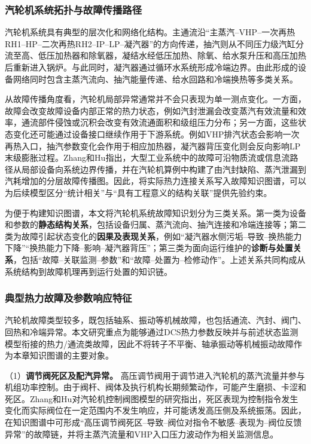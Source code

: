 \subsubsection{汽轮机系统拓扑与故障传播路径}

汽轮机系统具有典型的层次化和网络化结构。主通流沿“主蒸汽--VHP--一次再热RH1--HP--二次再热RH2--IP--LP--凝汽器”的方向传递，抽汽则从不同压力级汽缸分流至高、低压加热器和除氧器，凝结水经低压加热、除氧、给水泵升压和高压加热后重新进入锅炉。与此同时，凝汽器通过循环水系统形成冷端边界。由此形成的设备网络同时包含主蒸汽流向、抽汽能量传递、给水回路和冷端换热等多类关系。

从故障传播角度看，汽轮机局部异常通常并不会只表现为单一测点变化。一方面，故障会改变故障设备内部正常的热力状态，例如汽封泄漏会改变蒸汽有效流量和效率，通流部件侵蚀或沉积会改变有效流通面积和级组压力分布；另一方面，这些状态变化还可能通过设备接口继续作用于下游系统。例如VHP排汽状态会影响一次再热入口，抽汽参数变化会作用于相应加热器，凝汽器背压变化则会反向影响LP末级膨胀过程。Zhang和Hu指出，大型工业系统中的故障可沿物质流或信息流路径从局部设备向系统边界传播，并在汽轮机算例中构建了由汽封缺陷、蒸汽泄漏到汽耗增加的分层故障传播图\cite{ZhangHu2021FaultPropagationGNN}。因此，将实际热力连接关系写入故障知识图谱，可以为后续模型区分“统计相关”与“具有工程意义的结构关联”提供先验约束。

为便于构建知识图谱，本文将汽轮机系统故障知识划分为三类关系。第一类为设备和参数的\textbf{静态结构关系}，包括设备归属、蒸汽流向、抽汽连接和冷端连接等；第二类为故障引起状态变化的\textbf{因果及表现关系}，例如“凝汽器水侧污垢--导致--换热能力下降”“换热能力下降--影响--凝汽器背压”；第三类为面向运行维护的\textbf{诊断与处置关系}，包括“故障--关联监测--参数”和“故障--处置为--检修动作”。上述关系共同构成从系统结构到故障机理再到运行处置的知识链。

\subsubsection{典型热力故障及参数响应特征}

汽轮机故障类型较多，既包括轴系、振动等机械故障，也包括通流、汽封、阀门、回热和冷端异常。本文研究重点为能够通过DCS热力参数反映并与前述状态监测模型衔接的热力/通流类故障，因此不将转子不平衡、轴承振动等机械振动故障作为本章知识图谱的主要对象。

（1）\textbf{调节阀死区及配汽异常。} 高压调节阀用于调节进入汽轮机的蒸汽流量并参与机组功率控制。由于阀杆、阀体及执行机构长期频繁动作，可能产生磨损、卡涩和死区。Zhang和Hu对汽轮机控制阀图模型的研究指出，死区表现为控制指令发生变化而实际阀位在一定范围内不发生响应，并可能诱发高压侧及系统振荡\cite{ZhangHu2021ControlValveGraph}。因此，在知识图谱中可形成“高压调节阀死区--导致--阀位对指令不敏感--表现为--阀位反馈异常”的故障链，并将主蒸汽流量和VHP入口压力波动作为相关监测信息。

